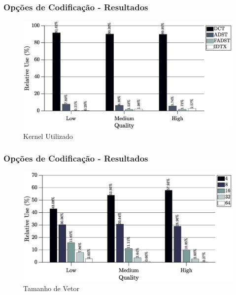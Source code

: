 \documentclass{beamer}
\begin{document}
\begin{frame}
       \frametitle{Opções de Codificação - Resultados}              
       \begin{center}
                     \begin{figure}[h]
                            \centering
                            \includegraphics[width=\textwidth]{Figures/kernelAvg.eps}
                            \caption{Kernel Utilizado}
                     \end{figure}
       \end{center}
\end{frame}


\begin{frame}
       \frametitle{Opções de Codificação - Resultados}              
       \begin{center}
                     \begin{figure}[h]
                            \centering
                            \includegraphics[width=\textwidth]{Figures/vectSizAvg.eps}
                            \caption{Tamanho de Vetor}
                     \end{figure}
       \end{center}
\end{frame}
\end{document}
